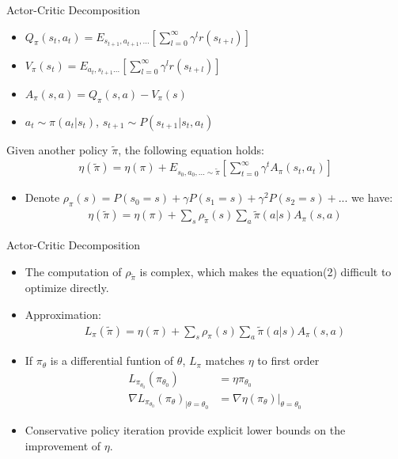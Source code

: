 \documentclass[mathserif]{beamer}
\begin{document}
\begin{frame}[t]{Actor-Critic Decomposition}
\begin{itemize}
  \item $Q_{\pi}(s_{t},a_{t})=E_{s_{t+1},a_{t+1},...}[\sum_{l=0}^{\infty}\gamma^{l}r(s_{t+l})]$
  \item $V_{\pi}(s_{t})=E_{a_{t},s_{t+1}...}[\sum_{l=0}^{\infty}\gamma^{l}r(s_{t+l})]$
  \item $A_{\pi}(s,a)=Q_{\pi}(s,a)-V_{\pi}(s)$
  \item $a_{t}\sim\pi(a_{t}|s_{t})$, $s_{t+1}\sim P(s_{t+1}|s_{t},a_{t})$
\end{itemize}
\begin{theorem}
  Given another policy $\tilde{\pi}$, the following equation holds:
  \begin{align}
    \eta(\tilde{\pi})=\eta(\pi)+E_{s_{0},a_{0},...\sim\tilde{\pi}}[\sum_{t=0}^{\infty}\gamma^{t}A_{\pi}(s_{t},a_{t})]
  \end{align}
\end{theorem}
\begin{itemize}
  \item Denote $\rho_{\pi}(s)=P(s_{0}=s)+\gamma P(s_{1}=s)+\gamma^{2}P(s_{2}=s)+...$ we have:
  \begin{align}
    \eta(\tilde{\pi})=\eta(\pi)+\sum_{s}\rho_{\tilde{\pi}}(s)\sum_{a}\tilde{\pi}(a|s)A_{\pi}(s,a)
  \end{align}
\end{itemize}
\end{frame}
\begin{frame}[t]{Actor-Critic Decomposition}
  \begin{itemize}
    \item The computation of $\rho_{\tilde{\pi}}$ is complex, which makes the equation(2) difficult to optimize directly.
    \item Approximation:
    \begin{align}
      L_{\pi}(\tilde{\pi})=\eta(\pi)+\sum_{s}\rho_{\pi}(s)\sum_{a}\tilde{\pi}(a|s)A_{\pi}(s,a)
    \end{align}
    \item If $\pi_{\theta}$ is a differential funtion of $\theta$, $L_{\pi}$ matches $\eta$ to first order
    \begin{align}
      L_{\pi_{\theta_{0}}}(\pi_{\theta_{0}})&=\eta{\pi_{\theta_{0}}}\\
      \nabla L_{\pi_{\theta_{0}}}(\pi_{\theta})_{|\theta=\theta_{0}}&=\nabla \eta(\pi_{\theta})|_{\theta=\theta_{0}}
    \end{align}
    \item Conservative policy iteration provide explicit lower bounds on the improvement of $\eta$.
  \end{itemize}
\end{frame}
\end{document}
